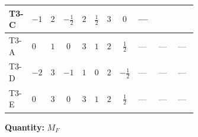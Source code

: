 \documentclass[8pt]{article}
\begin{document}
\begin{landscape}
\begin{longtable}{@{}llcccccc >{\raggedright\arraybackslash}p{0.21\linewidth} >{\raggedright\arraybackslash}p{0.21\linewidth} >{\raggedright\arraybackslash}p{0.21\linewidth}@{}}
\midrule
T3-C & $-1$ & $2$ & $-\frac{1}{2}$ & $2$ & $\frac{1}{2}$ & $3$ & $0$ & --- & \scriptsize\adjustbox{max width=\linewidth}{$\begin{gathered} \frac{1}{2} (\left(\left({M_F}\right)^{T}\,\left({y_1}\right)^{\dagger}\,{y_1}\right)_{ij}+\left(\left({y_1}\right)^{T}\,\left({y_1}\right)^{*}\,{M_F}\right)_{ij}+\left(\left({M_F}\right)^{T}\,\left({y_2}\right)^{\dagger}\,{y_2}\right)_{ij}+\left(\left({y_2}\right)^{T}\,\left({y_2}\right)^{*}\,{M_F}\right)_{ij})\end{gathered}$} & \scriptsize\adjustbox{max width=\linewidth}{$\begin{gathered} -6 {g_2}^2 (\left(\left({M_F}\right)^{T}\right)_{ij}+\left({M_F}\right)_{ij})\end{gathered}$} \\
\midrule
T3-A & $0$ & $1$ & $0$ & $3$ & $1$ & $2$ & $\frac{1}{2}$ & --- & --- & --- \\
\midrule
T3-D & $-2$ & $3$ & $-1$ & $1$ & $0$ & $2$ & $-\frac{1}{2}$ & --- & --- & --- \\
\midrule
T3-E & $0$ & $3$ & $0$ & $3$ & $1$ & $2$ & $\frac{1}{2}$ & --- & --- & --- \\
\midrule
\bottomrule
\end{longtable}
\clearpage
\noindent\textbf{Quantity: }$M_F$\par\smallskip

\end{landscape}
\end{document}
